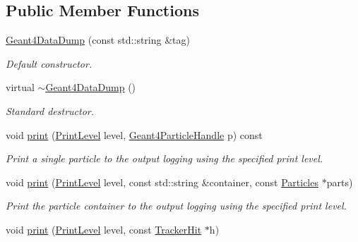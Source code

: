 \subsection*{Public Member Functions}
\begin{DoxyCompactItemize}
\item 
\hyperlink{class_d_d4hep_1_1_simulation_1_1_geant4_data_dump_a2709938040240f38f527791859ebaf34}{Geant4\+Data\+Dump} (const std\+::string \&tag)
\begin{DoxyCompactList}\small\item\em Default constructor. \end{DoxyCompactList}\item 
virtual \hyperlink{class_d_d4hep_1_1_simulation_1_1_geant4_data_dump_af966fda61c5237ac2858834cdeb1e238}{$\sim$\+Geant4\+Data\+Dump} ()
\begin{DoxyCompactList}\small\item\em Standard destructor. \end{DoxyCompactList}\item 
void \hyperlink{class_d_d4hep_1_1_simulation_1_1_geant4_data_dump_ab563bcb9592305e9ee151f1b01306bd2}{print} (\hyperlink{namespace_d_d4hep_a5b5a64d56252469451f2020a27d57d42}{Print\+Level} level, \hyperlink{class_d_d4hep_1_1_simulation_1_1_geant4_particle_handle}{Geant4\+Particle\+Handle} p) const
\begin{DoxyCompactList}\small\item\em Print a single particle to the output logging using the specified print level. \end{DoxyCompactList}\item 
void \hyperlink{class_d_d4hep_1_1_simulation_1_1_geant4_data_dump_a50918352a7c46d20e94d26b4cf5d5e39}{print} (\hyperlink{namespace_d_d4hep_a5b5a64d56252469451f2020a27d57d42}{Print\+Level} level, const std\+::string \&container, const \hyperlink{class_d_d4hep_1_1_simulation_1_1_geant4_data_dump_a78b5910af0db1442a14600ae8dfc2a92}{Particles} $\ast$parts)
\begin{DoxyCompactList}\small\item\em Print the particle container to the output logging using the specified print level. \end{DoxyCompactList}\item 
void \hyperlink{class_d_d4hep_1_1_simulation_1_1_geant4_data_dump_af3765022b8a03075fde40b2129b468e8}{print} (\hyperlink{namespace_d_d4hep_a5b5a64d56252469451f2020a27d57d42}{Print\+Level} level, const \hyperlink{class_d_d4hep_1_1_simulation_1_1_geant4_data_dump_aaeea8b5b317a9a22e13f472200917ad2}{Tracker\+Hit} $\ast$h)

\end{DoxyCompactItemize}
